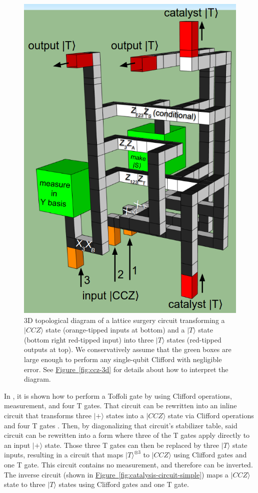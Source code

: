 \documentclass[twocolumn,accepted=2019-03-30]{quantumarticle}
\newcommand{\fig}[1]{\hyperref[fig:#1]{Figure~\ref*{fig:#1}}}
\begin{document}
\begin{figure}
  \label{fig:catalysis-3d}
  \includegraphics[width=\textwidth,height=\dimexpr\textheight-6\baselineskip,keepaspectratio]{catalysis-3d.png}
  \caption{
    3D topological diagram of a lattice surgery circuit transforming a $|CCZ\rangle$ state (orange-tipped inputs at bottom) and a $|T\rangle$ state (bottom right red-tipped input) into three $|T\rangle$ states (red-tipped outputs at top).
    We conservatively assume that the green boxes are large enough to perform any single-qubit Clifford with negligible error.
    See \fig{ccz-3d} for details about how to interpret the diagram.
  }
\end{figure}

In \cite{jones2013}, it is shown how to perform a Toffoli gate by using Clifford operations, measurement, and four T gates.
That circuit can be rewritten into an inline circuit that transforms three $|+\rangle$ states into a $|CCZ\rangle$ state via Clifford operations and four T gates \cite{gidney2018}.
Then, by diagonalizing that circuit's stabilizer table, said circuit can be rewritten into a form where three of the T gates apply directly to an input $|+\rangle$ state.
Those three T gates can then be replaced by three $|T\rangle$ state inputs, resulting in a circuit that maps $|T\rangle^{\otimes 3}$ to $|CCZ\rangle$ using Clifford gates and one T gate.
This circuit contains no measurement, and therefore can be inverted.
The inverse circuit (shown in \fig{catalysis-circuit-simple}) maps a $|CCZ\rangle$ state to three $|T\rangle$ states using Clifford gates and one T gate.
\end{document}
